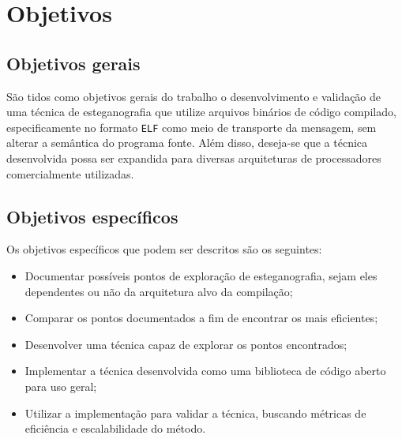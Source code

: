 
\section{Objetivos}
\label{sec.goals}

\subsection{Objetivos gerais }
\label{sec.goals.general}

São tidos como objetivos gerais do trabalho o desenvolvimento e validação de uma técnica de esteganografia que utilize arquivos binários de código compilado, especificamente no formato \texttt{ELF} como meio de transporte da mensagem, sem alterar a semântica do programa fonte. Além disso, deseja-se que a técnica desenvolvida possa ser expandida para diversas arquiteturas de processadores comercialmente utilizadas.

\subsection{Objetivos específicos}

Os objetivos específicos que podem ser descritos são os seguintes:

\label{sec.goals.specific}

\begin{itemize}

\item Documentar possíveis pontos de exploração de esteganografia, sejam eles dependentes ou não da arquitetura alvo da compilação;
\item Comparar os pontos documentados a fim de encontrar os mais eficientes;
\item Desenvolver uma técnica capaz de explorar os pontos encontrados;
\item Implementar a técnica desenvolvida como uma biblioteca de código aberto para uso geral;
\item Utilizar a implementação para validar a técnica, buscando métricas de eficiência e escalabilidade do método.

\end{itemize}
